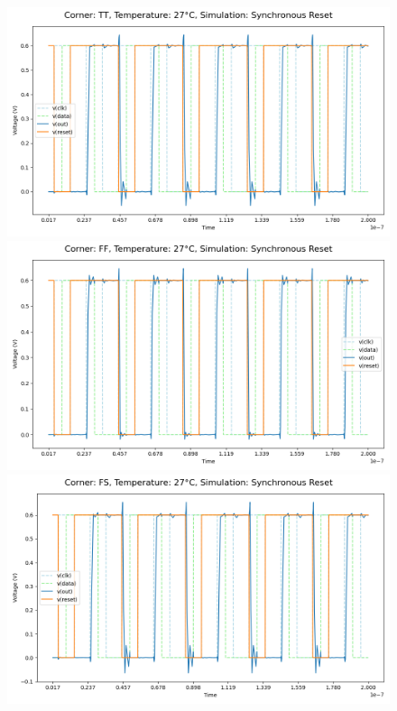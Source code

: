 \begin{figure}[H]
    \centering
    \includegraphics[height= 0.21\textheight]{figures/aimspice/TT/27/W4.csv.png}
    \vspace{5pt}
    \includegraphics[height= 0.21\textheight]{figures/aimspice/FF/27/W4.csv.png}
    \vspace{5pt}
    \includegraphics[height= 0.21\textheight]{figures/aimspice/FS/27/W4.csv.png}

\end{figure}
